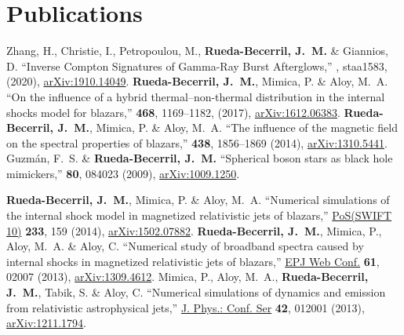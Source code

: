 \section{Publications}

\renewcommand{\refname}{Articles}
\setcounter{num}{0}
\renewcommand{\MyNbOfPub}{4}  
\renewcommand*{\bibliographyitemlabel}{[\arabic{enumiv}]}
\begin{thebibliography}{99}
   Zhang, H., Christie, I., Petropoulou, M., \textbf{Rueda-Becerril, J.~M.} \& Giannios, D. ``Inverse Compton Signatures of Gamma-Ray Burst Afterglows,'' \href{https://doi.org/10.1093/mnras/staa1583}{\mnras}, staa1583, (2020), \href{https://arxiv.org/abs/1910.14049}{arXiv:1910.14049}.
   \textbf{Rueda-Becerril, J.~M.}, Mimica, P. \& Aloy, M.~A. ``On the influence of a hybrid thermal--non-thermal distribution in the internal shocks model for blazars,'' \href{https://doi.org/10.1093/mnras/stx476}{\mnras} \textbf{468}, 1169--1182, (2017), \href{https://arxiv.org/abs/1612.06383}{arXiv:1612.06383}.
   \textbf{Rueda-Becerril, J.~M.}, Mimica, P. \& Aloy, M.~A. ``The influence of the magnetic field on the spectral properties of blazars,'' \href{https://doi.org/10.1093/mnras/stt2335}{\mnras} \textbf{438}, 1856--1869 (2014), \href{https://arxiv.org/abs/1310.5441}{arXiv:1310.5441}.
   Guzm{\'a}n, F.~S. \& \textbf{Rueda-Becerril, J.~M.} ``Spherical boson stars as black hole mimickers,''  \href{https://doi.org/10.1103/PhysRevD.80.084023}{\prd} \textbf{80}, 084023 (2009), \href{https://arxiv.org/abs/1009.1250}{arXiv:1009.1250}.
\end{thebibliography}
\renewcommand{\refname}{Proceedings}
\setcounter{num}{0}
\renewcommand{\MyNbOfPub}{3}
\renewcommand*{\bibliographyitemlabel}{\arabic{enumiv}.}
\begin{thebibliography}{99}
   \textbf{Rueda-Becerril, J.~M.}, Mimica, P. \& Aloy, M.~A. ``Numerical simulations of the internal shock model in magnetized relativistic jets of blazars,'' \href{https://doi.org/10.22323/1.233.0159}{PoS(SWIFT 10)} \textbf{233}, 159 (2014), \href{https://arxiv.org/abs/1502.07882}{arXiv:1502.07882}.
   \textbf{Rueda-Becerril, J.~M.}, Mimica, P., Aloy, M.~A. \& Aloy, C. ``Numerical study of broadband spectra caused by internal shocks in magnetized relativistic jets of blazars,'' \href{https://doi.org/10.1051/epjconf/20136102007}{EPJ Web Conf.} \textbf{61}, 02007 (2013), \href{https://arxiv.org/abs/1309.4612}{arXiv:1309.4612}.
   Mimica, P., Aloy, M.~A., \textbf{Rueda-Becerril, J.~M.}, Tabik, S. \& Aloy, C. ``Numerical simulations of dynamics and emission from relativistic astrophysical jets,'' \href{https://doi.org/10.1088/1742-6596/454/1/012001}{J. Phys.: Conf. Ser} \textbf{42}, 012001 (2013), \href{https://arxiv.org/abs/1211.1794}{arXiv:1211.1794}.
\end{thebibliography}


